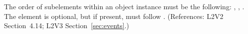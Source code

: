 The order of subelements within an \Event object instance must be
the following: , ,
.  The  element is
optional, but if present, must follow .
(References: L2V2 Section~4.14; L2V3 Section~\ref{sec:events}.)
